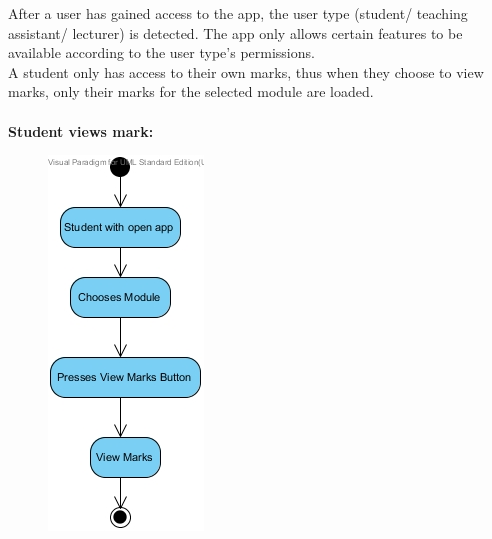 \documentclass[12pt,a4paper]{article}
\begin{document}
After a user has gained access to the app, the user type (student/ teaching assistant/ lecturer) is detected.  The app only allows certain features to be available according to the user type\textquoteright s permissions.
\\

A student only has access to their own marks, thus when they choose to view marks, only their marks for the selected module are loaded. \\
\\
\textbf {Student views mark:}
\begin{figure}[h]
\begin{center}
\includegraphics[scale=0.8]{./AndroidActivityDiagrams/ActivityDiagram2}
\end{center}
\end{figure} 
\end{document}

